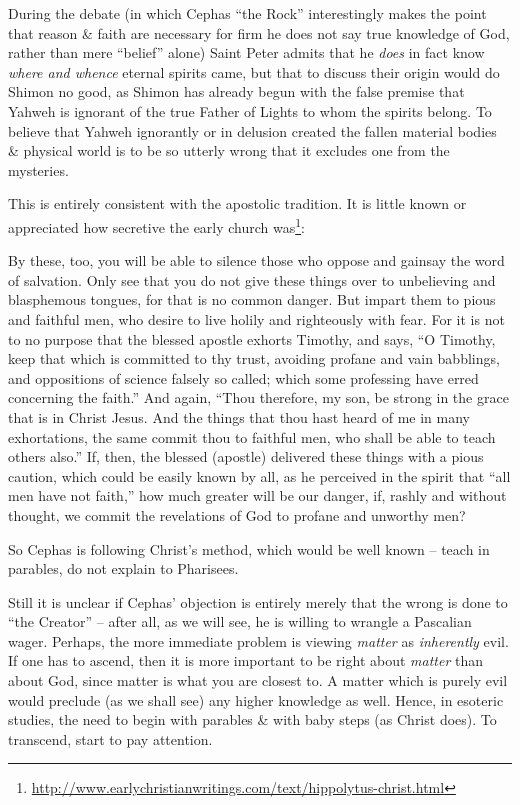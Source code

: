 During the debate (in which Cephas ``the Rock'' interestingly makes the point that reason \& faith are necessary for firm he does not say true knowledge of God, rather than mere ``belief'' alone) Saint Peter admits that he \emph{does} in fact know \emph{where and whence} eternal spirits came, but that to discuss their origin would do Shimon no good, as Shimon has already begun with the false premise that Yahweh is ignorant of the true Father of Lights to whom the spirits belong. To believe that Yahweh ignorantly or in delusion created the fallen material bodies \& physical world is to be so utterly wrong that it excludes one from the mysteries.

This is entirely consistent with the apostolic tradition. It is little known or appreciated how secretive the early church was\footnote{\url{http://www.earlychristianwritings.com/text/hippolytus-christ.html}}:

\begin{quotex}
By these, too, you will be able to silence those who oppose and gainsay the word of salvation. Only see that you do not give these things over to unbelieving and blasphemous tongues, for that is no common danger. But impart them to pious and faithful men, who desire to live holily and righteously with fear. For it is not to no purpose that the blessed apostle exhorts Timothy, and says, ``O Timothy, keep that which is committed to thy trust, avoiding profane and vain babblings, and oppositions of science falsely so called; which some professing have erred concerning the faith.'' And again, ``Thou therefore, my son, be strong in the grace that is in Christ Jesus. And the things that thou hast heard of me in many exhortations, the same commit thou to faithful men, who shall be able to teach others also.'' If, then, the blessed (apostle) delivered these things with a pious caution, which could be easily known by all, as he perceived in the spirit that ``all men have not faith,'' how much greater will be our danger, if, rashly and without thought, we commit the revelations of God to profane and unworthy men?
\end{quotex}


So Cephas is following Christ's method, which would be well known -- teach in parables, do not explain to Pharisees.

Still it is unclear if Cephas' objection is entirely merely that the wrong is done to ``the Creator'' -- after all, as we will see, he is willing to wrangle a Pascalian wager. Perhaps, the more immediate problem is viewing \emph{matter} as \emph{inherently} evil. If one has to ascend, then it is more important to be right about \emph{matter} than about God, since matter is what you are closest to. A matter which is purely evil would preclude (as we shall see) any higher knowledge as well. Hence, in esoteric studies, the need to begin with parables \& with baby steps (as Christ does). To transcend, start to pay attention.

